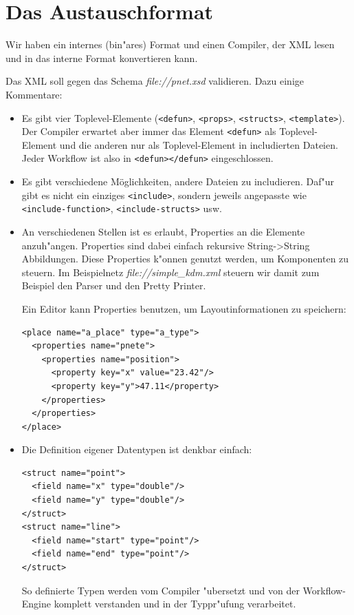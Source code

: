 \documentclass[a4paper,12pt]{article}
\newlength{\st}\setlength{\st}{0pt}
\newcommand{\file}[1]{\textsl{file://#1}}
\newcommand{\element}[1]{\texttt{<#1>}}
\begin{document}
\section{Das Austauschformat}

Wir haben ein internes (bin"ares) Format und einen Compiler, der XML
lesen und in das interne Format konvertieren kann.

Das XML soll gegen das Schema \file{pnet.xsd} validieren. Dazu
einige Kommentare:

\begin{itemize}

\item Es gibt vier Toplevel-Elemente (\element{defun}, \element{props},
  \element{structs}, \element{template}). Der Compiler erwartet aber
  immer das Element \element{defun} als Toplevel-Element und die anderen
  nur als Toplevel-Element in includierten Dateien. Jeder Workflow ist
  also in \element{defun></defun} eingeschlossen.

\item Es gibt verschiedene M\"oglichkeiten, andere Dateien zu
  includieren. Daf"ur gibt es nicht ein einziges \element{include},
  sondern jeweils angepasste wie \element{include-function},
  \element{include-structs} usw. 

\item An verschiedenen Stellen ist es erlaubt, Properties an die
  Elemente anzuh"angen. Properties sind dabei einfach rekursive
  String->String Abbildungen. Diese Properties k"onnen genutzt werden,
  um Komponenten zu steuern. Im Beispielnetz \file{simple\_kdm.xml}
  steuern wir damit zum Beispiel den Parser und den Pretty Printer.

  Ein Editor kann Properties benutzen, um Layoutinformationen zu
  speichern:
\begin{verbatim}
<place name="a_place" type="a_type">
  <properties name="pnete">
    <properties name="position">
      <property key="x" value="23.42"/>
      <property key="y">47.11</property>
    </properties>
  </properties>
</place>
\end{verbatim}

\item Die Definition eigener Datentypen ist denkbar einfach:
\begin{verbatim}
<struct name="point">
  <field name="x" type="double"/>
  <field name="y" type="double"/>
</struct>
<struct name="line">
  <field name="start" type="point"/>
  <field name="end" type="point"/>
</struct>
\end{verbatim}
  So definierte Typen werden vom Compiler "ubersetzt und von der
  Workflow-Engine komplett verstanden und in der Typpr"ufung verarbeitet.


\end{itemize}
\end{document}
